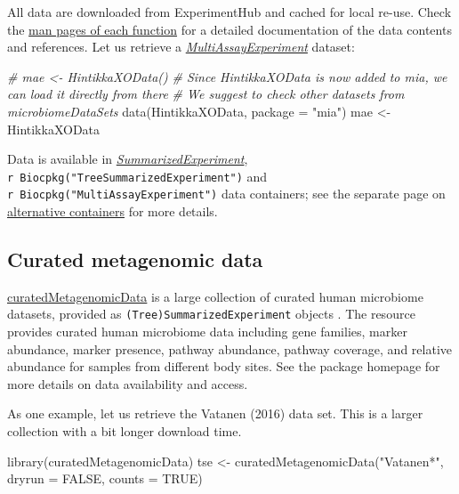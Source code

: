 \documentclass[
]{book}
\newenvironment{Shaded}{\begin{snugshade}}{\end{snugshade}}
\newcommand{\AttributeTok}[1]{\textcolor[rgb]{0.77,0.63,0.00}{#1}}
\newcommand{\CommentTok}[1]{\textcolor[rgb]{0.56,0.35,0.01}{\textit{#1}}}
\newcommand{\ConstantTok}[1]{\textcolor[rgb]{0.00,0.00,0.00}{#1}}
\newcommand{\FunctionTok}[1]{\textcolor[rgb]{0.00,0.00,0.00}{#1}}
\newcommand{\NormalTok}[1]{#1}
\newcommand{\OtherTok}[1]{\textcolor[rgb]{0.56,0.35,0.01}{#1}}
\newcommand{\StringTok}[1]{\textcolor[rgb]{0.31,0.60,0.02}{#1}}
\begin{document}
All data are downloaded from ExperimentHub and cached for local
re-use. Check the \href{https://microbiome.github.io/microbiomeDataSets/reference/index.html}{man pages of each
function}
for a detailed documentation of the data contents and references. Let
us retrieve a \emph{\href{https://bioconductor.org/packages/3.17/MultiAssayExperiment}{MultiAssayExperiment}} dataset:

\begin{Shaded}
\begin{Highlighting}[]
\CommentTok{\# mae \textless{}{-} HintikkaXOData()}
\CommentTok{\# Since HintikkaXOData is now added to mia, we can load it directly from there}
\CommentTok{\# We suggest to check other datasets from microbiomeDataSets}
\FunctionTok{data}\NormalTok{(HintikkaXOData, }\AttributeTok{package =} \StringTok{"mia"}\NormalTok{)}
\NormalTok{mae }\OtherTok{\textless{}{-}}\NormalTok{ HintikkaXOData}
\end{Highlighting}
\end{Shaded}

Data is available in \emph{\href{https://bioconductor.org/packages/3.17/SummarizedExperiment}{SummarizedExperiment}}, \texttt{r\ Biocpkg("TreeSummarizedExperiment")} and \texttt{r\ Biocpkg("MultiAssayExperiment")} data containers; see the separate
page on \href{https://microbiome.github.io/OMA/multitable.html}{alternative
containers} for more
details.

\hypertarget{curated-metagenomic-data}{%
\subsection{Curated metagenomic data}\label{curated-metagenomic-data}}

\href{https://bioconductor.org/packages/release/data/experiment/html/curatedMetagenomicData.html}{curatedMetagenomicData}
is a large collection of curated human microbiome datasets, provided as
\texttt{(Tree)SummarizedExperiment} objects \citep{Pasolli2017}. The resource
provides curated human microbiome data including gene families, marker
abundance, marker presence, pathway abundance, pathway coverage, and
relative abundance for samples from different body sites. See the
package homepage for more details on data availability and access.

As one example, let us retrieve the Vatanen (2016) \citep{Vatanen2016} data
set. This is a larger collection with a bit longer download time.

\begin{Shaded}
\begin{Highlighting}[]
\FunctionTok{library}\NormalTok{(curatedMetagenomicData)}
\NormalTok{tse }\OtherTok{\textless{}{-}} \FunctionTok{curatedMetagenomicData}\NormalTok{(}\StringTok{"Vatanen*"}\NormalTok{, }\AttributeTok{dryrun =} \ConstantTok{FALSE}\NormalTok{, }\AttributeTok{counts =} \ConstantTok{TRUE}\NormalTok{)}
\end{Highlighting}
\end{Shaded}
\end{document}
